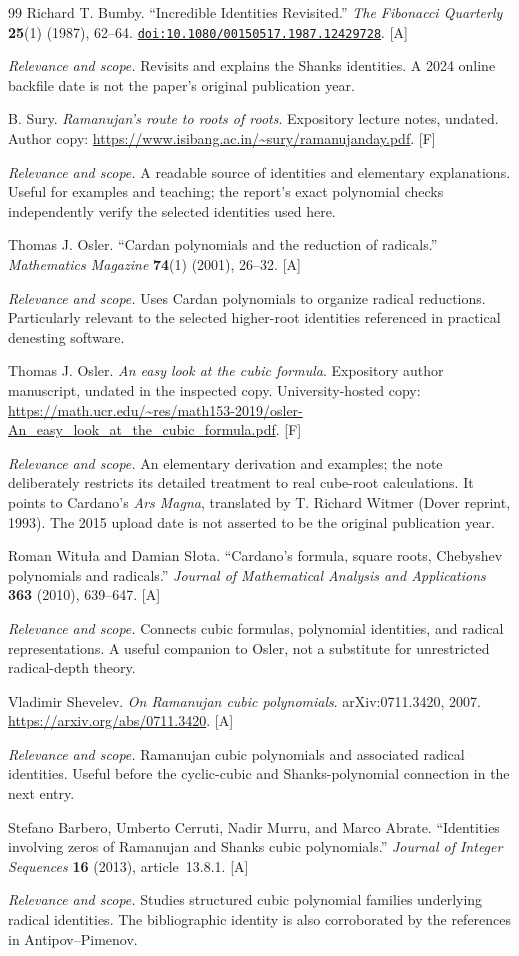 \documentclass[11pt,oneside]{article}
\numberwithin{equation}{section}
\theoremstyle{definition}
\theoremstyle{remark}
\newcommand{\doi}[1]{\href{https://doi.org/#1}{\nolinkurl{doi:#1}}}
\newcommand{\status}[1]{\textsf{\small[#1]}}
\newcommand{\entrynote}[1]{\par\smallskip\noindent\emph{Relevance and scope.} #1}
\begin{document}
\begin{thebibliography}{99}
Richard T. Bumby. ``Incredible Identities Revisited.'' \emph{The Fibonacci Quarterly} \textbf{25}(1) (1987), 62--64. \doi{10.1080/00150517.1987.12429728}. \status{A}
\entrynote{Revisits and explains the Shanks identities. A 2024 online backfile date is not the paper's original publication year.}

B. Sury. \emph{Ramanujan's route to roots of roots}. Expository lecture notes, undated. Author copy: \url{https://www.isibang.ac.in/~sury/ramanujanday.pdf}. \status{F}
\entrynote{A readable source of identities and elementary explanations. Useful for examples and teaching; the report's exact polynomial checks independently verify the selected identities used here.}

Thomas J. Osler. ``Cardan polynomials and the reduction of radicals.'' \emph{Mathematics Magazine} \textbf{74}(1) (2001), 26--32. \status{A}
\entrynote{Uses Cardan polynomials to organize radical reductions. Particularly relevant to the selected higher-root identities referenced in practical denesting software.}

Thomas J. Osler. \emph{An easy look at the cubic formula}. Expository author manuscript, undated in the inspected copy. University-hosted copy: \url{https://math.ucr.edu/~res/math153-2019/osler-An_easy_look_at_the_cubic_formula.pdf}. \status{F}
\entrynote{An elementary derivation and examples; the note deliberately restricts its detailed treatment to real cube-root calculations. It points to Cardano's \emph{Ars Magna}, translated by T. Richard Witmer (Dover reprint, 1993). The 2015 upload date is not asserted to be the original publication year.}

Roman Witu\l a and Damian S\l ota. ``Cardano's formula, square roots, Chebyshev polynomials and radicals.'' \emph{Journal of Mathematical Analysis and Applications} \textbf{363} (2010), 639--647. \status{A}
\entrynote{Connects cubic formulas, polynomial identities, and radical representations. A useful companion to Osler, not a substitute for unrestricted radical-depth theory.}

Vladimir Shevelev. \emph{On Ramanujan cubic polynomials}. arXiv:0711.3420, 2007. \url{https://arxiv.org/abs/0711.3420}. \status{A}
\entrynote{Ramanujan cubic polynomials and associated radical identities. Useful before the cyclic-cubic and Shanks-polynomial connection in the next entry.}

Stefano Barbero, Umberto Cerruti, Nadir Murru, and Marco Abrate. ``Identities involving zeros of Ramanujan and Shanks cubic polynomials.'' \emph{Journal of Integer Sequences} \textbf{16} (2013), article~13.8.1. \status{A}
\entrynote{Studies structured cubic polynomial families underlying radical identities. The bibliographic identity is also corroborated by the references in Antipov--Pimenov.}


\end{thebibliography}
\end{document}
